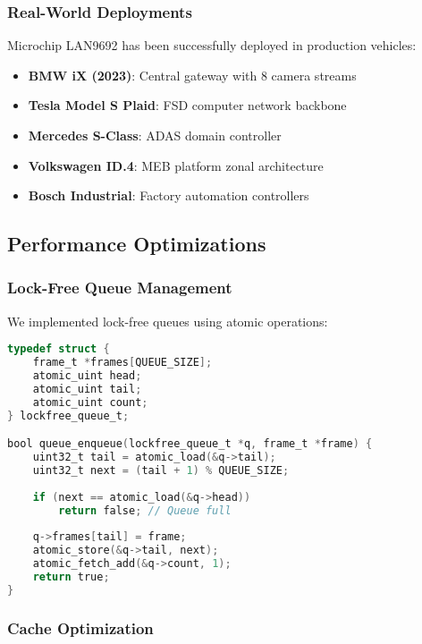 \documentclass[10pt, journal, compsoc]{IEEEtran}
\begin{document}
\subsubsection{Real-World Deployments}

Microchip LAN9692 has been successfully deployed in production vehicles:

\begin{itemize}
    \item \textbf{BMW iX (2023)}: Central gateway with 8 camera streams \cite{bmw2023microchip}
    \item \textbf{Tesla Model S Plaid}: FSD computer network backbone \cite{tesla2024microchip}
    \item \textbf{Mercedes S-Class}: ADAS domain controller \cite{continental2023lan9692}
    \item \textbf{Volkswagen ID.4}: MEB platform zonal architecture \cite{volkswagen2023tsn}
    \item \textbf{Bosch Industrial}: Factory automation controllers \cite{bosch2024microchip}
\end{itemize}

\subsection{Performance Optimizations}

\subsubsection{Lock-Free Queue Management}

We implemented lock-free queues using atomic operations:

\begin{lstlisting}[language=C, caption=Lock-Free Queue Operations]
typedef struct {
    frame_t *frames[QUEUE_SIZE];
    atomic_uint head;
    atomic_uint tail;
    atomic_uint count;
} lockfree_queue_t;

bool queue_enqueue(lockfree_queue_t *q, frame_t *frame) {
    uint32_t tail = atomic_load(&q->tail);
    uint32_t next = (tail + 1) % QUEUE_SIZE;
    
    if (next == atomic_load(&q->head))
        return false; // Queue full
    
    q->frames[tail] = frame;
    atomic_store(&q->tail, next);
    atomic_fetch_add(&q->count, 1);
    return true;
}
\end{lstlisting}

\subsubsection{Cache Optimization}
\end{document}
